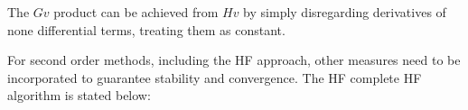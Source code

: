 The $Gv$ product can be achieved from $Hv$ by simply disregarding derivatives of none differential terms, treating them as constant.

For second order methods, including the HF approach, other measures need to be incorporated to guarantee stability and convergence. The HF complete HF algorithm is stated below:

\begin{algorithm}
    \begin{algorithmic}
        \EndFor
    \end{algorithmic}
\end{algorithm}